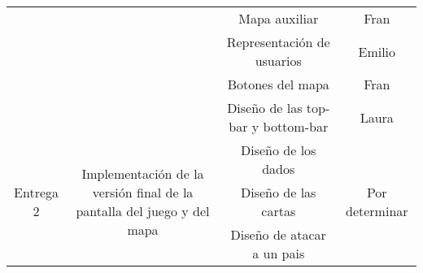\documentclass[11pt, a4paper, titlepage]{article}
\begin{document}
\begin{landscape}
\begin{table}[hbt!]
\begin{tabular}{c|ccll|cc|}
\multicolumn{1}{|c|}{}                            & \multicolumn{1}{c|}{}                                                                                           & \multicolumn{3}{c|}{Mapa auxiliar}                                                                             & \multicolumn{2}{c|}{Fran}                                                    \\ \cline{3-7} 
\multicolumn{1}{|c|}{}                            & \multicolumn{1}{c|}{}                                                                                           & \multicolumn{3}{c|}{Representación de usuarios}                                                                & \multicolumn{2}{c|}{Emilio}                                                  \\ \cline{3-7} 
\multicolumn{1}{|c|}{}                            & \multicolumn{1}{c|}{}                                                                                           & \multicolumn{3}{c|}{Botones del mapa}                                                                          & \multicolumn{2}{c|}{Fran}                                                    \\ \cline{3-7} 
\multicolumn{1}{|c|}{}                            & \multicolumn{1}{c|}{}                                                                                           & \multicolumn{3}{c|}{Diseño de las top-bar y bottom-bar}                                                        & \multicolumn{2}{c|}{Laura}                                                   \\ \hline
\multicolumn{1}{|c|}{\multirow{22}{*}{Entrega 2}} & \multicolumn{1}{c|}{\multirow{8}{*}{Implementación de la versión final de la pantalla del juego y del mapa}}    & \multicolumn{3}{c|}{Diseño de los dados}                                                                       & \multicolumn{2}{c|}{\multirow{22}{*}{Por determinar}}                        \\ \cline{3-5}
\multicolumn{1}{|c|}{}                            & \multicolumn{1}{c|}{}                                                                                           & \multicolumn{3}{c|}{Diseño de las cartas}                                                                      & \multicolumn{2}{c|}{}                                                        \\ \cline{3-5}
\multicolumn{1}{|c|}{}                            & \multicolumn{1}{c|}{}                                                                                           & \multicolumn{3}{c|}{Diseño de atacar a un pais}                                                                & \multicolumn{2}{c|}{}                                                        \\ \cline{3-5}

\end{tabular}
\end{table}
\end{landscape}
\end{document}
